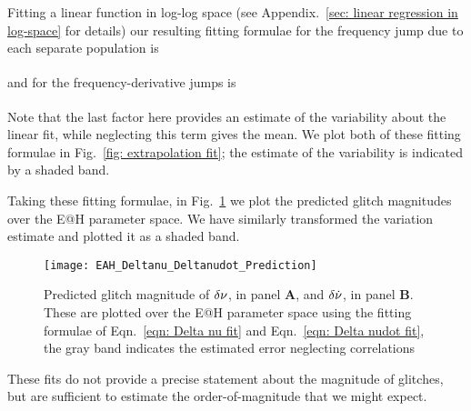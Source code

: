 \documentclass[../full_thesis/full_thesis.tex]{subfiles}
\newcommand{\thisdir}{../glitches_in_CGW}
\begin{document}
Fitting a linear function in log-log space (see Appendix.~\ref{sec: linear regression in log-space} for details) our resulting fitting formulae for
the frequency jump due to each separate population is
\begin{align}
\begin{split}
\\

\end{split}
\label{eqn: Delta nu fit}
\end{align}
and for the frequency-derivative jumps is
\begin{align}
\begin{split}
\\

\end{split}
\label{eqn: Delta nudot fit}
\end{align}
Note that the last factor here provides
an estimate of the variability about the linear fit, while neglecting this term
gives the mean.
We plot both of these fitting formulae in Fig.~\ref{fig: extrapolation fit};
the estimate of the variability is indicated by a shaded band.

Taking these fitting formulae, in Fig.~\ref{fig: EAH Delta nu nudot prediction} we plot
the predicted glitch magnitudes over the E@H parameter space. We have similarly
transformed the variation estimate and plotted it as a shaded band.
\begin{figure}[htb]
\centering
\texttt{[image: EAH\_Deltanu\_Deltanudot\_Prediction]}
\caption{Predicted glitch magnitude of $\delta\nu$, in panel \textbf{A}, and
$\delta\dot{\nu}$, in panel \textbf{B}. These are plotted over the E@H parameter
space using the fitting formulae of Eqn.~\eqref{eqn: Delta nu fit} and
Eqn.~\eqref{eqn: Delta nudot fit}, the gray band indicates the estimated error
neglecting correlations}
\label{fig: EAH Delta nu nudot prediction}
\end{figure}
These fits do not provide a precise statement about the magnitude of glitches,
but are sufficient to estimate the order-of-magnitude that we might expect.
\end{document}

